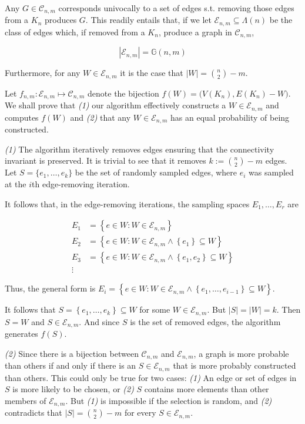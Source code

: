 \documentclass[a4paper, 12pt]{article}
\begin{document}
\pagebreak 

Any $G \in \mathcal{C}_{n, m}$ corresponds univocally to a set of edges
s.t. removing those edges from a $K_n$ produces $G$. This readily entails that,
if we let $\mathcal{E}_{n, m} \subseteq \Lambda(n)$ be the class of edges which,
if removed from a $K_n$, produce a graph in $\mathcal{C}_{n, m}$,

$$
|\mathcal{E}_{n, m}| = \mathbb{G}(n, m)
$$

Furthermore, for any $W \in \mathcal{E}_{n, m}$ it is the case that $|W| =
\binom{n}{2} - m$. 

Let $f_{n,m} : \mathcal{E}_{n,m} \mapsto \mathcal{C}_{n, m}$ denote the
bijection $f(W) = \Big(V(K_n), E(K_n) - W\Big)$. We shall prove that
\textit{(1)} our algorithm effectively constructs a $W \in \mathcal{E}_{n,m}$
and computes $f(W)$ and \textit{(2)} that any $W \in \mathcal{E}_{n,m}$ has an
equal probability of being constructed.

\textit{(1)} The algorithm iteratively removes edges ensuring that the
connectivity invariant is preserved. It is trivial to see that it removes $k :=
\binom{n}{2} - m$ edges. Let $S = \{e_1, \ldots, e_{k}\}$ be the set of
randomly sampled edges, where $e_i$ was sampled at the $i$th edge-removing
iteration.

It follows that, in the edge-removing iterations, the sampling spaces $E_1,
\ldots, E_r$ are

\begin{align*}
    E_1 &= \left\{ e \in W : W \in \mathcal{E}_{n,m}  \right\}  \\ 
    E_2 &= \left\{ e \in W : W \in \mathcal{E}_{n,m} \land \left\{ e_1 \right\}  \subseteq  W  \right\} \\ 
    E_3 &= \left\{ e \in W : W \in \mathcal{E}_{n,m} \land \left\{ e_1, e_2 \right\}  \subseteq  W  \right\} \\ 
    \vdots 
\end{align*}

Thus, the general form is $E_i = \left\{ e \in W : W \in \mathcal{E}_{n,m} \land \left\{ e_1, \ldots, e_{i-1} \right\} \subseteq W \right\} $.

It follows that $S = \left\{ e_1, \ldots, e_k \right\} \subseteq W$ for some $W
\in \mathcal{E}_{n,m}$. But $|S| = |W| = k$. Then $S = W$ and $S \in
\mathcal{E}_{n,m}$. And since $S$ is the set of removed edges, the algorithm
generates $f(S)$.

\textit{(2)} Since there is a bijection between $\mathcal{C}_{n,m}$ and
$\mathcal{E}_{n,m}$, a graph is more probable than others if and only if there
is an $S \in \mathcal{E}_{n,m}$ that is more probably constructed than others.
This could only be true for two cases: \textit{(1)} An edge or set of edges in
$S$ is more likely to be chosen, or \textit{(2)} $S$ contains more elements
than other members of $\mathcal{E}_{n,m}$. But \textit{(1)} is impossible if
the selection is random, and \textit{(2)} contradicts that $|S| = \binom{n}{2}
- m$ for every $S \in \mathcal{E}_{n,m}$.
\end{document}
